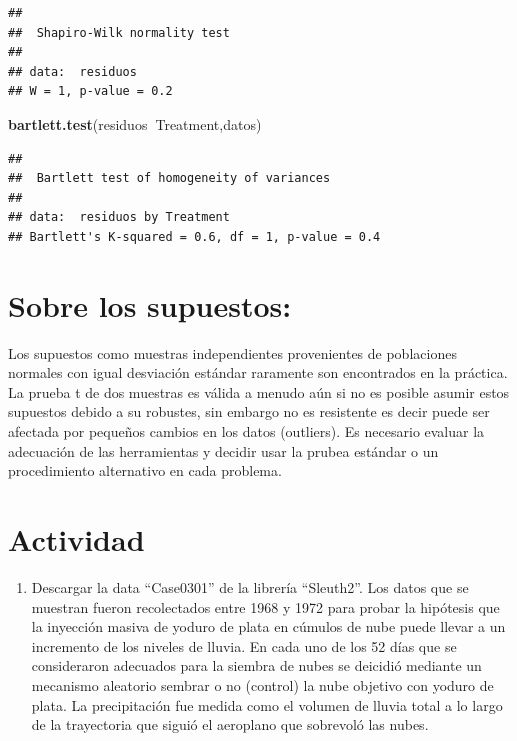 \documentclass[]{book}
\newenvironment{Shaded}{\begin{snugshade}}{\end{snugshade}}
\newcommand{\KeywordTok}[1]{\textcolor[rgb]{0.13,0.29,0.53}{\textbf{#1}}}
\newcommand{\OperatorTok}[1]{\textcolor[rgb]{0.81,0.36,0.00}{\textbf{#1}}}
\newcommand{\NormalTok}[1]{#1}
\providecommand{\tightlist}{%
  \setlength{\itemsep}{0pt}\setlength{\parskip}{0pt}}
\begin{document}
\begin{verbatim}
## 
##  Shapiro-Wilk normality test
## 
## data:  residuos
## W = 1, p-value = 0.2
\end{verbatim}

\begin{Shaded}
\begin{Highlighting}[]
\KeywordTok{bartlett.test}\NormalTok{(residuos}\OperatorTok{~}\NormalTok{Treatment,datos)}
\end{Highlighting}
\end{Shaded}

\begin{verbatim}
## 
##  Bartlett test of homogeneity of variances
## 
## data:  residuos by Treatment
## Bartlett's K-squared = 0.6, df = 1, p-value = 0.4
\end{verbatim}

\section{Sobre los supuestos:}\label{sobre-los-supuestos}

Los supuestos como muestras independientes provenientes de poblaciones
normales con igual desviación estándar raramente son encontrados en la
práctica. La prueba t de dos muestras es válida a menudo aún si no es
posible asumir estos supuestos debido a su robustes, sin embargo no es
resistente es decir puede ser afectada por pequeños cambios en los datos
(outliers). Es necesario evaluar la adecuación de las herramientas y
decidir usar la prubea estándar o un procedimiento alternativo en cada
problema.

\section{Actividad}\label{actividad-1}

\begin{enumerate}
\def\labelenumi{\arabic{enumi}.}
\tightlist
\item
  Descargar la data ``Case0301'' de la librería ``Sleuth2''. Los datos
  que se muestran fueron recolectados entre 1968 y 1972 para probar la
  hipótesis que la inyección masiva de yoduro de plata en cúmulos de
  nube puede llevar a un incremento de los niveles de lluvia. En cada
  uno de los 52 días que se consideraron adecuados para la siembra de
  nubes se deicidió mediante un mecanismo aleatorio sembrar o no
  (control) la nube objetivo con yoduro de plata. La precipitación fue
  medida como el volumen de lluvia total a lo largo de la trayectoria
  que siguió el aeroplano que sobrevoló las nubes.
\end{enumerate}
\end{document}
